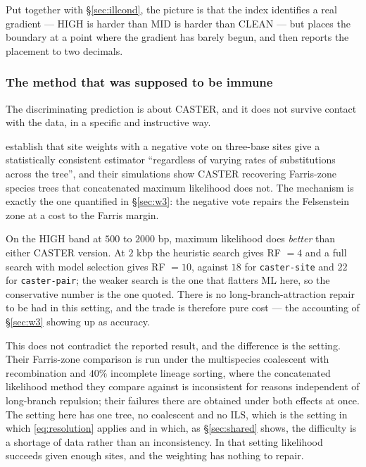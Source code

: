 \documentclass[preprint,12pt,authoryear]{elsarticle}
\theoremstyle{definition}
\theoremstyle{remark}
\begin{document}
Put together with \S\ref{sec:illcond}, the picture is that the index
identifies a real gradient --- HIGH is harder than MID is harder than CLEAN
--- but places the boundary at a point where the gradient has barely begun,
and then reports the placement to two decimals.

\subsubsection{The method that was supposed to be immune}
\label{sec:caster}

The discriminating prediction is about CASTER, and it does not survive
contact with the data, in a specific and instructive way.

\citet{zhang2025caster} establish that site weights with a negative vote on
three-base sites give a statistically consistent estimator ``regardless of
varying rates of substitutions across the tree'', and their simulations show
CASTER recovering Farris-zone species trees that concatenated maximum
likelihood does not. The mechanism is exactly the one quantified in
\S\ref{sec:w3}: the negative vote repairs the Felsenstein zone at a cost to
the Farris margin.

On the HIGH band at $500$ to $2000$ bp, maximum likelihood does \emph{better}
than either CASTER version. At $2$ kbp the heuristic search gives RF $=4$ and
a full search with model selection gives RF $=10$, against $18$ for
\texttt{caster-site} and $22$ for \texttt{caster-pair}; the weaker search is
the one that flatters ML here, so the conservative number is the one quoted.
There is no long-branch-attraction repair to be had in this setting, and the
trade is therefore pure cost --- the accounting of \S\ref{sec:w3} showing up
as accuracy.

This does not contradict the reported result, and the difference is the
setting. Their Farris-zone comparison is run under the multispecies
coalescent with recombination and $40\%$ incomplete lineage sorting, where
the concatenated likelihood method they compare against is inconsistent for
reasons independent of long-branch repulsion; their failures there are
obtained under both effects at once. The setting here has one tree, no
coalescent and no ILS, which is the setting in which \eqref{eq:resolution}
applies and in which, as \S\ref{sec:shared} shows, the difficulty is a
shortage of data rather than an inconsistency. In that setting likelihood
succeeds given enough sites, and the weighting has nothing to repair.
\end{document}
